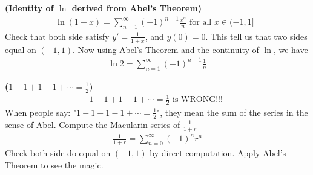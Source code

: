 \documentclass{report}
\begin{document}
\begin{mdframed}
\begin{Example}{\textbf{(Identity of $\ln$ derived from Abel's Theorem)}}{}
\begin{align*}
  \ln (1+x)=\sum_{n=1}^{\infty} (-1)^{n-1} \frac{x^n}{n}\text{ for all $x \in (-1,1]$ }
\end{align*}
Check that both side satisfy $y'=\frac{1}{1+x}$, and $y(0)=0$. This tell us that two sides equal on  $(-1,1)$. Now using Abel's Theorem and the continuity of $\ln$, we have 
\begin{align*}
\ln 2= \sum_{n=1}^{\infty} (-1)^{n-1} \frac{1}{n}
\end{align*}
\end{Example}
\begin{Example}{\textbf{($1-1+1-1+\cdots=\frac{1}{2}$)}}{}
\begin{align*}
1-1+1-1+\cdots = \frac{1}{2}\text{ is WRONG!!! }
\end{align*}
When people say: "$1-1+1-1+\cdots =\frac{1}{2}$", they mean the sum of the series in the sense of Abel. Compute the Macularin series of $\frac{1}{1+r}$
\begin{align*}
\frac{1}{1+r}=\sum_{n=0}^{\infty}(-1)^nr^n
\end{align*}
Check both side do equal on $(-1,1)$ by direct computation. Apply Abel's Theorem to see the magic. 
\end{Example}
\end{mdframed}
\end{document}
